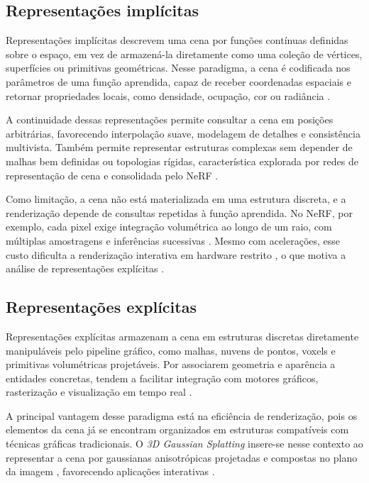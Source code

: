 \subsection{Representações implícitas}

Representações implícitas descrevem uma cena por funções contínuas definidas sobre o espaço, em vez de armazená-la diretamente como uma coleção de vértices, superfícies ou primitivas geométricas. Nesse paradigma, a cena é codificada nos parâmetros de uma função aprendida, capaz de receber coordenadas espaciais e retornar propriedades locais, como densidade, ocupação, cor ou radiância \cite{sitzmann2019srn,mildenhall2020}.

A continuidade dessas representações permite consultar a cena em posições arbitrárias, favorecendo interpolação suave, modelagem de detalhes e consistência multivista. Também permite representar estruturas complexas sem depender de malhas bem definidas ou topologias rígidas, característica explorada por redes de representação de cena e consolidada pelo NeRF \cite{sitzmann2019srn,mildenhall2020,barron2021mipnerf}.

Como limitação, a cena não está materializada em uma estrutura discreta, e a renderização depende de consultas repetidas à função aprendida. No NeRF, por exemplo, cada pixel exige integração volumétrica ao longo de um raio, com múltiplas amostragens e inferências sucessivas \cite{mildenhall2020,muller2022}. Mesmo com acelerações, esse custo dificulta a renderização interativa em hardware restrito \cite{muller2022,xu2023}, o que motiva a análise de representações explícitas \cite{kerbl2023,fei2025survey3dgs}.

\subsection{Representações explícitas}

Representações explícitas armazenam a cena em estruturas discretas diretamente manipuláveis pelo pipeline gráfico, como malhas, nuvens de pontos, voxels e primitivas volumétricas projetáveis. Por associarem geometria e aparência a entidades concretas, tendem a facilitar integração com motores gráficos, rasterização e visualização em tempo real \cite{zwicker2001,kerbl2023,fei2025survey3dgs}.

A principal vantagem desse paradigma está na eficiência de renderização, pois os elementos da cena já se encontram organizados em estruturas compatíveis com técnicas gráficas tradicionais. O \textit{3D Gaussian Splatting} insere-se nesse contexto ao representar a cena por gaussianas anisotrópicas projetadas e compostas no plano da imagem \cite{kerbl2023}, favorecendo aplicações interativas \cite{kerbl2023,fei2025survey3dgs}.


